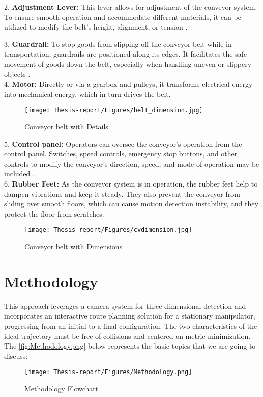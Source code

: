 \documentclass[12pt]{article}
\begin{document}
2.	\textbf {Adjustment Lever:}
 This lever allows for adjustment of the conveyor system.  To ensure smooth operation and accommodate different materials, it can be utilized to modify the belt's height, alignment, or tension \cite{ref22}.

3.	\textbf {Guardrail:}
 To stop goods from slipping off the conveyor belt while in transportation, guardrails are positioned along its edges.  It facilitates the safe movement of goods down the belt, especially when handling uneven or slippery objects \cite{ref22}.\\

4.	\textbf {Motor:}
 Directly or via a gearbox and pulleys, it transforms electrical energy into mechanical energy, which in turn drives the belt\cite{ref22}. \\
\begin{figure}[h]
    \centering
    \texttt{[image: Thesis-report/Figures/belt\_dimension.jpg]}
    \caption{Conveyor belt with Details\cite{ref22}}
    \label{fig1:conveyor-belt-with-details}
\end{figure}

5.	\textbf {Control panel:}
 Operators can oversee the conveyor's operation from the control panel. Switches, speed controls, emergency stop buttons, and other controls to modify the conveyor's direction, speed, and mode of operation may be included \cite{ref22}. \\

6.	\textbf{Rubber Feet:}
 As the conveyor system is in operation, the rubber feet help to dampen vibrations and keep it steady.   They also prevent the conveyor from sliding over smooth floors, which can cause motion detection instability, and they protect the floor from scratches\cite{ref22}.\\

\begin{figure}[h]
    \centering
    \texttt{[image: Thesis-report/Figures/cvdimension.jpg]}
    \caption{Conveyor belt with Dimensions\cite{ref22}}
    \label{fig:cv-dimension}
\end{figure}

\section{Methodology}

This approach leverages a camera system for three-dimensional detection and incorporates an interactive route planning solution for a stationary manipulator, progressing from an initial to a final configuration.   The two characteristics of the ideal trajectory must be free of collisions and centered on metric minimization.\\
The \autoref{fig:Methodology.png} below represents the basic topics that we are going to discuss:
\begin{figure}[H]  %
  \centering
  \texttt{[image: Thesis-report/Figures/Methodology.png]}
  \caption{Methodology Flowchart \cite{ref18}}
  \label{fig:Methodology.png}
\end{figure}
\end{document}
